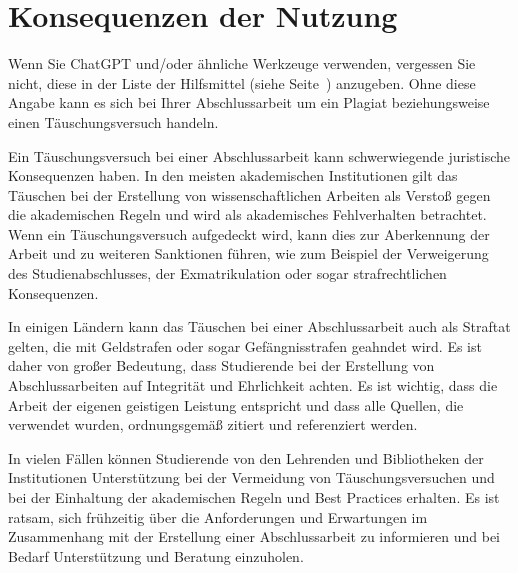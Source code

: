

\section{Konsequenzen der Nutzung}\label{apdx:sect:Consequences}
Wenn Sie ChatGPT und/oder ähnliche Werkzeuge verwenden, vergessen Sie nicht, diese in der Liste der Hilfsmittel (siehe Seite~\pageref{Tools}) anzugeben. Ohne diese Angabe kann es sich bei Ihrer Abschlussarbeit um ein Plagiat beziehungsweise einen Täuschungsversuch handeln.


Ein Täuschungsversuch bei einer Abschlussarbeit kann schwerwiegende juristische Konsequenzen haben. In den meisten akademischen Institutionen gilt das Täuschen bei der Erstellung von wissenschaftlichen Arbeiten als Verstoß gegen die akademischen Regeln und wird als akademisches Fehlverhalten betrachtet. Wenn ein Täuschungsversuch aufgedeckt wird, kann dies zur Aberkennung der Arbeit und zu weiteren Sanktionen führen, wie zum Beispiel der Verweigerung des Studienabschlusses, der Exmatrikulation oder sogar strafrechtlichen Konsequenzen.

In einigen Ländern kann das Täuschen bei einer Abschlussarbeit auch als Straftat gelten, die mit Geldstrafen oder sogar Gefängnisstrafen geahndet wird. Es ist daher von großer Bedeutung, dass Studierende bei der Erstellung von Abschlussarbeiten auf Integrität und Ehrlichkeit achten. Es ist wichtig, dass die Arbeit der eigenen geistigen Leistung entspricht und dass alle Quellen, die verwendet wurden, ordnungsgemäß zitiert und referenziert werden.

In vielen Fällen können Studierende von den Lehrenden und Bibliotheken der Institutionen Unterstützung bei der Vermeidung von Täuschungsversuchen und bei der Einhaltung der akademischen Regeln und Best Practices erhalten. Es ist ratsam, sich frühzeitig über die Anforderungen und Erwartungen im Zusammenhang mit der Erstellung einer Abschlussarbeit zu informieren und bei Bedarf Unterstützung und Beratung einzuholen.


